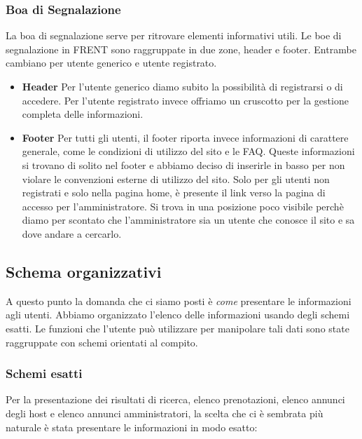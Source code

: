 \documentclass[1_relazione.tex]{subfiles}
\begin{document}
    \subsubsection{Boa di Segnalazione}
    La boa di segnalazione serve per ritrovare elementi informativi utili. Le boe di segnalazione in FRENT sono raggruppate in due zone, header e footer. Entrambe cambiano per utente generico e utente registrato.

    \begin{itemize}
        \item \textbf{Header}
        Per l'utente generico diamo subito la possibilit\`{a} di registrarsi o di accedere. Per l'utente registrato invece offriamo un cruscotto per la gestione completa delle informazioni.
        \item \textbf{Footer}
        Per tutti gli utenti, il footer riporta invece informazioni di carattere generale, come le condizioni di utilizzo del sito e le FAQ. Queste informazioni si trovano di solito nel footer e abbiamo deciso di inserirle in basso per non violare le convenzioni esterne di utilizzo del sito. Solo per gli utenti non registrati e solo nella pagina home, \`{e} presente il link verso la pagina di accesso per l'amministratore. Si trova in una posizione poco visibile perch\`{e} diamo per scontato che l'amministratore sia un utente che conosce il sito e sa dove andare a cercarlo.
    \end{itemize}


    \subsection{Schema organizzativi}
    A questo punto la domanda che ci siamo posti \`{e} \textit{come} presentare le informazioni agli utenti. Abbiamo organizzato l'elenco delle informazioni usando degli schemi esatti. Le funzioni che l'utente pu\`{o} utilizzare per manipolare tali dati sono state raggruppate con schemi orientati al compito.

    \subsubsection{Schemi esatti}
    Per la presentazione dei risultati di ricerca, elenco prenotazioni, elenco annunci degli host e elenco annunci amministratori, la scelta che ci \`{e} sembrata pi\`{u} naturale \`{e} stata presentare le informazioni in modo esatto:
\end{document}
